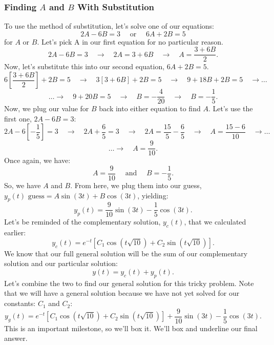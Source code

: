 \documentclass[a4paper,12pt]{article}
\begin{document}
\subsubsection*{Finding $A$ and $B$ With Substitution}
To use the method of substitution, let's solve one of our equations:
$$ 2A - 6B = 3 \quad \text{ or } \quad 6A + 2B = 5 $$
for $A$ or $B$. Let's pick A in our first equation for no particular reason.
$$ 2A - 6B = 3 \quad\rightarrow \quad 2A = 3 + 6B \quad\rightarrow \quad A = \frac{3 + 6B}{2}.$$
Now, let's substitute this into our second equation, $6A + 2B = 5.$
$$ 6\left[\frac{3 + 6B}{2}\right] + 2B = 5 \quad\rightarrow \quad 3[3 + 6B] + 2B = 5 \quad\rightarrow \quad 9 + 18B + 2B = 5 \quad\rightarrow \ldots $$
$$ \ldots\rightarrow \quad 9 + 20B = 5 \quad\rightarrow \quad B = -\frac{4}{20} \quad\rightarrow\quad B = -\frac{1}{5}. $$
Now, we plug our value for $B$ back into either equation to find $A$. Let's use the first one, $2A - 6B = 3$:
$$ 2A - 6\left[-\frac{1}{5}\right] = 3 \quad\rightarrow \quad 2A + \frac{6}{5} = 3 \quad\rightarrow \quad 2A = \frac{15}{5} - \frac{6}{5} \quad\rightarrow \quad A = \frac{15 - 6}{10} \quad\rightarrow\ldots$$
$$\ldots\rightarrow \quad A = \frac{9}{10}. $$
Once again, we have:
$$  A = \frac{9}{10} \quad\text{ and }\quad B = -\frac{1}{5}. $$
So, we have $A$ and $B$. From here, we plug them into our guess, $y_p(t) \text{ guess} = A\sin(3t) + B\cos(3t)$, yielding:
$$ \boxed{y_p(t) = \frac{9}{10}\sin{(3t)} - \frac{1}{5}\cos{(3t).}} $$
Let's be reminded of the complementary solution, $y_c(t)$, that we calculated earlier:
$$  y_c(t) = e^{-t}\left[C_1\cos{\left(t\sqrt{10}\right)} + C_2\sin{\left(t\sqrt{10}\right)}\right].$$
We know that our full general solution will be the sum of our complementary solution and our particular solution:
$$ y(t) = y_c(t) + y_p(t). $$
Let's combine the two to find our general solution for this tricky problem. Note that we will have a general solution because we have not yet solved for our constants: $C_1$ and $C_2$:
$$ \boxed{y_g(t) = e^{-t}\left[C_1\cos{\left(t\sqrt{10}\right)} + C_2\sin{\left(t\sqrt{10}\right)}\right] +  \frac{9}{10}\sin{(3t)} -  \frac{1}{5}\cos{(3t).}} $$
This is an important milestone, so we'll box it. We'll box and underline our final answer. \\
\end{document}
